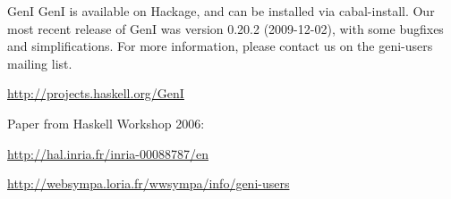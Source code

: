 \begin{hcarentry}{GenI}
GenI is available on Hackage, and can be installed via cabal-install.
Our most recent release of GenI was version 0.20.2 (2009-12-02), with
some bugfixes and simplifications.  For more information, please contact
us on the geni-users mailing list.

\FurtherReading
\begin{compactitem}
\item \url{http://projects.haskell.org/GenI}
\item Paper from Haskell Workshop 2006:

\url{http://hal.inria.fr/inria-00088787/en}
\item \url{http://websympa.loria.fr/wwsympa/info/geni-users}
\end{compactitem}
\end{hcarentry}
